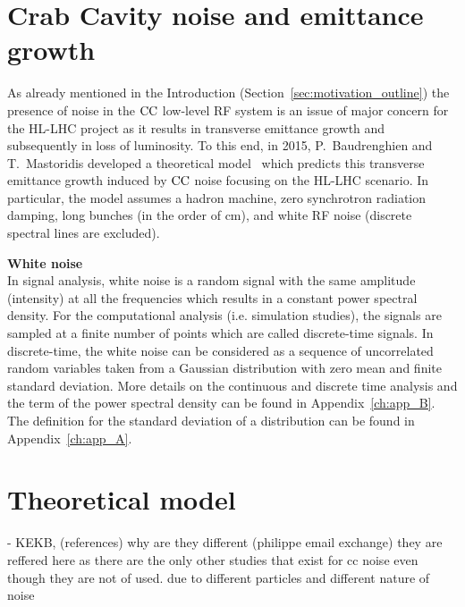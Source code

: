 \section{Crab Cavity noise and emittance growth}\label{eq:CC_noise_intro}
As already mentioned in the Introduction (Section~\ref{sec:motivation_outline}) the presence of noise in the ${\mathrm{CC}}$ low-level RF system is an issue of major concern for the HL-LHC project as it results in transverse emittance growth and subsequently in loss of luminosity. To this end, in 2015, P.~Baudrenghien and T.~Mastoridis developed a theoretical model~\cite{PhysRevSTAB.18.101001} which predicts this transverse emittance growth induced by ${\mathrm{CC}}$ noise focusing on the HL-LHC scenario. In particular, the model assumes a hadron machine, zero synchrotron radiation damping, long bunches (in the order of cm), and white RF noise (discrete spectral lines are excluded).

\textbf{White noise}\\
In signal analysis, white noise is a random signal with the same amplitude (intensity) at all the frequencies which results in a constant power spectral density. For the computational analysis (i.e. simulation studies), the signals are sampled at a finite number of points which are called discrete-time signals. In discrete-time, the white noise can be considered as a sequence of uncorrelated random variables taken from a Gaussian distribution with zero mean and finite standard deviation. More details on the continuous and discrete time analysis and the term of the power spectral density can be found in Appendix~\ref{ch:app_B}. The definition for the standard deviation of a distribution can be found in Appendix~\ref{ch:app_A}.




\section{Theoretical model}\label{eq:CC_emit_growth_formulas}


- KEKB, (references) why are they different (philippe email exchange) they are reffered here as there are the only other studies that exist for cc noise even though they are not of used. due to different particles and different nature of noise


